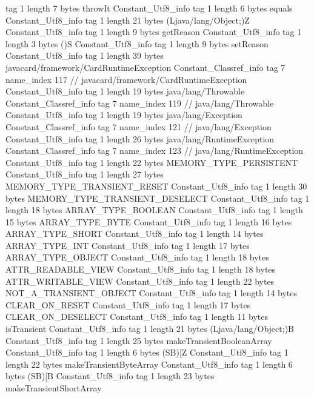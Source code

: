 {{{			tag	1
			length	7
			bytes	throwIt
		}
		Constant_Utf8_info {
			tag	1
			length	6
			bytes	equals
		}
		Constant_Utf8_info {
			tag	1
			length	21
			bytes	(Ljava/lang/Object;)Z
		}
		Constant_Utf8_info {
			tag	1
			length	9
			bytes	getReason
		}
		Constant_Utf8_info {
			tag	1
			length	3
			bytes	()S
		}
		Constant_Utf8_info {
			tag	1
			length	9
			bytes	setReason
		}
		Constant_Utf8_info {
			tag	1
			length	39
			bytes	javacard/framework/CardRuntimeException
		}
		Constant_Classref_info {
			tag	7
			name_index	117		// javacard/framework/CardRuntimeException
		}
		Constant_Utf8_info {
			tag	1
			length	19
			bytes	java/lang/Throwable
		}
		Constant_Classref_info {
			tag	7
			name_index	119		// java/lang/Throwable
		}
		Constant_Utf8_info {
			tag	1
			length	19
			bytes	java/lang/Exception
		}
		Constant_Classref_info {
			tag	7
			name_index	121		// java/lang/Exception
		}
		Constant_Utf8_info {
			tag	1
			length	26
			bytes	java/lang/RuntimeException
		}
		Constant_Classref_info {
			tag	7
			name_index	123		// java/lang/RuntimeException
		}
		Constant_Utf8_info {
			tag	1
			length	22
			bytes	MEMORY_TYPE_PERSISTENT
		}
		Constant_Utf8_info {
			tag	1
			length	27
			bytes	MEMORY_TYPE_TRANSIENT_RESET
		}
		Constant_Utf8_info {
			tag	1
			length	30
			bytes	MEMORY_TYPE_TRANSIENT_DESELECT
		}
		Constant_Utf8_info {
			tag	1
			length	18
			bytes	ARRAY_TYPE_BOOLEAN
		}
		Constant_Utf8_info {
			tag	1
			length	15
			bytes	ARRAY_TYPE_BYTE
		}
		Constant_Utf8_info {
			tag	1
			length	16
			bytes	ARRAY_TYPE_SHORT
		}
		Constant_Utf8_info {
			tag	1
			length	14
			bytes	ARRAY_TYPE_INT
		}
		Constant_Utf8_info {
			tag	1
			length	17
			bytes	ARRAY_TYPE_OBJECT
		}
		Constant_Utf8_info {
			tag	1
			length	18
			bytes	ATTR_READABLE_VIEW
		}
		Constant_Utf8_info {
			tag	1
			length	18
			bytes	ATTR_WRITABLE_VIEW
		}
		Constant_Utf8_info {
			tag	1
			length	22
			bytes	NOT_A_TRANSIENT_OBJECT
		}
		Constant_Utf8_info {
			tag	1
			length	14
			bytes	CLEAR_ON_RESET
		}
		Constant_Utf8_info {
			tag	1
			length	17
			bytes	CLEAR_ON_DESELECT
		}
		Constant_Utf8_info {
			tag	1
			length	11
			bytes	isTransient
		}
		Constant_Utf8_info {
			tag	1
			length	21
			bytes	(Ljava/lang/Object;)B
		}
		Constant_Utf8_info {
			tag	1
			length	25
			bytes	makeTransientBooleanArray
		}
		Constant_Utf8_info {
			tag	1
			length	6
			bytes	(SB)[Z
		}
		Constant_Utf8_info {
			tag	1
			length	22
			bytes	makeTransientByteArray
		}
		Constant_Utf8_info {
			tag	1
			length	6
			bytes	(SB)[B
		}
		Constant_Utf8_info {
			tag	1
			length	23
			bytes	makeTransientShortArray
}}}
